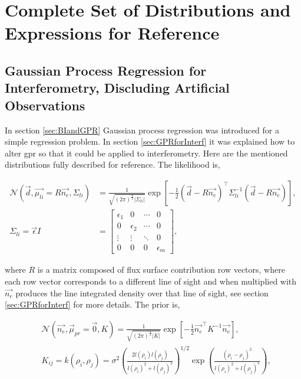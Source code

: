 \chapter{Complete Set of Distributions and Expressions for Reference}
\label{append:distexpres}
\section{Gaussian Process Regression for Interferometry, Discluding Artificial Observations}

In section \ref{sec:BIandGPR} Gaussian process regression was introduced for a simple regression problem. In section \ref{sec:GPRforInterf} it was explained how to alter \gls{gpr} so that it could be applied to interferometry. Here are the mentioned distributions fully described for reference.  The likelihood is,

$$
\begin{aligned}
\mathcal{N}(\vec{d}, \vec{\mu_{li}} = R\vec{n_e}, \Sigma_{li}) &= \frac{1}{\sqrt{(2\pi)^{\frac{n}{2}}|\Sigma_{li}|}} \exp \left[{{-\frac{1}{2}(\vec{d}-R\vec{n_e})^\top\Sigma_{li}^{-1}(\vec{d}-R\vec{n_e})}}\right],\\
\Sigma_{li} = \vec{\epsilon}I &=
\begin{bmatrix}
\epsilon_1 & 0 & \cdots & 0\\
0 & \epsilon_2 & \cdots & 0\\
\vdots & \vdots & \ddots & 0 \\
0 & 0 & 0 &\epsilon_m
\end{bmatrix},
\end{aligned}
$$
  
\noindent where $R$ is a matrix composed of flux surface contribution row vectors, where each row vector corresponds to a different line of sight and when multiplied with $\vec{n_e}$ produces the line integrated density over that line of sight, see section \ref{sec:GPRforInterf} for more details. The prior is,

$$
\begin{aligned}
&\mathcal{N}(\vec{n_e}, \vec \mu_{pr} = \vec{0}, K) = \frac{1}{\sqrt{(2\pi)^{\frac{n}{2}}|K|}} \exp \left[{{-\frac{1}{2}\vec{n_e}^\top K^{-1}\vec{n_e}}}\right],\\
&K_{ij} = k(\rho_i, \rho_j) = \sigma^2 \left( \frac{2l(\rho_i)l(\rho_j)}{l(\rho_i)^2 + l(\rho_j)^2} \right)^{1/2} \exp\left({\frac{(\rho_i - \rho_j)^2}{l(\rho_i)^2+l(\rho_j)^2}}\right),\\
\end{aligned}
$$

